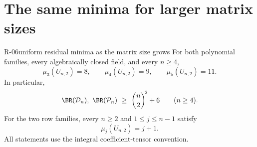 \section{The same minima for larger matrix sizes}

\begin{finding}{R-06}{uniform residual minima as the matrix size grows}
For both polynomial families, every algebraically closed field,
and every $n\geq4$,
\[
 \mu_3(U_{n,2})=8,\qquad
 \mu_4(U_{n,2})=9,\qquad
 \mu_5(U_{n,2})=11.
\]
In particular,
\[
 \BR(\mathcal D_n),\ \BR(\mathcal P_n)
 \ \geq\ \binom n2^{\!2}+6\qquad(n\geq4).
\]
For the two row families, every $n\geq2$ and
$1\leq j\leq n-1$ satisfy
\[
 \mu_j(U_{n,2})=j+1.
\]
All statements use the integral coefficient-tensor convention.
\end{finding}
